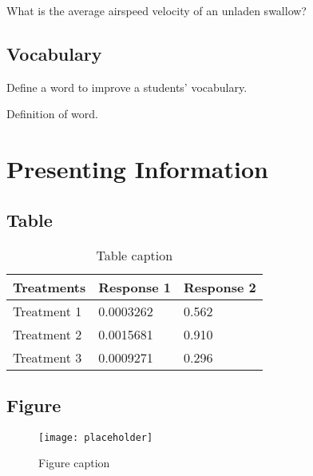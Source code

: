 \documentclass[11pt,fleqn,oneside,openany]{book} %
\begin{document}
\begin{problem}
What is the average airspeed velocity of an unladen swallow?
\end{problem}


\section{Vocabulary}

Define a word to improve a students' vocabulary.

\begin{vocabulary}[Word]
Definition of word.
\end{vocabulary}



\chapter{Presenting Information}

\section{Table}

\begin{table}[h]
\centering
\begin{tabular}{l l l}
\toprule
\textbf{Treatments} & \textbf{Response 1} & \textbf{Response 2}\\
\midrule
Treatment 1 & 0.0003262 & 0.562 \\
Treatment 2 & 0.0015681 & 0.910 \\
Treatment 3 & 0.0009271 & 0.296 \\
\bottomrule
\end{tabular}
\caption{Table caption}
\end{table}


\section{Figure}

\begin{figure}[h]
\centering\texttt{[image: placeholder]}
\caption{Figure caption}
\end{figure}
\end{document}
